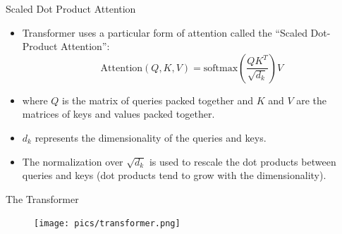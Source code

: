 \documentclass[handout]{beamer}
\begin{document}
\begin{frame}{Scaled Dot Product Attention}
\begin{scriptsize}
\begin{itemize}

 \item  Transformer uses a particular form of attention called the “Scaled Dot-Product Attention”:
 \begin{displaymath}
  \text{Attention}(Q,K,V) = \text{softmax}\left(\frac{QK^T}{\sqrt{d_k}}\right)V
 \end{displaymath}

 \item where $Q$ is the matrix of queries packed together and $K$ and $V$ are the matrices of keys and values packed together. 
 
 \item $d_k$ represents the dimensionality of the queries and keys.
 
  \item The normalization over $\sqrt{d_k}$ is used to rescale the dot products between queries and keys (dot products tend to grow with the dimensionality).
 
\end{itemize}

\end{scriptsize}

\end{frame}


\begin{frame}{The Transformer}

     \begin{figure}[h]
        	\texttt{[image: pics/transformer.png]}
        \end{figure}  


\end{frame}
\end{document}
